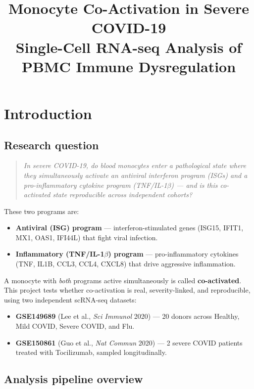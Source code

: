 \documentclass[11pt, a4paper]{article}
\title{\textbf{Monocyte Co-Activation in Severe COVID-19}\\
\large Single-Cell RNA-seq Analysis of PBMC Immune Dysregulation}
\author{}
\date{}
\begin{document}
\maketitle

\section{Introduction}

\subsection{Research question}

\begin{quote}
\textit{In severe COVID-19, do blood monocytes enter a pathological state where
they simultaneously activate an antiviral interferon program (ISGs) and a
pro-inflammatory cytokine program (TNF/IL-1$\beta$) — and is this co-activated
state reproducible across independent cohorts?}
\end{quote}

These two programs are:
\begin{itemize}[nosep]
  \item \textbf{Antiviral (ISG) program} — interferon-stimulated genes (ISG15, IFIT1, MX1, OAS1, IFI44L) that fight viral infection.
  \item \textbf{Inflammatory (TNF/IL-1$\beta$) program} — pro-inflammatory cytokines (TNF, IL1B, CCL3, CCL4, CXCL8) that drive aggressive inflammation.
\end{itemize}

A monocyte with \textit{both} programs active simultaneously is called \textbf{co-activated}.
This project tests whether co-activation is real, severity-linked, and reproducible,
using two independent scRNA-seq datasets:
\begin{itemize}[nosep]
  \item \textbf{GSE149689} (Lee et al., \textit{Sci Immunol} 2020) — 20 donors across Healthy, Mild COVID, Severe COVID, and Flu.
  \item \textbf{GSE150861} (Guo et al., \textit{Nat Commun} 2020) — 2 severe COVID patients treated with Tocilizumab, sampled longitudinally.
\end{itemize}

\subsection{Analysis pipeline overview}
\end{document}
